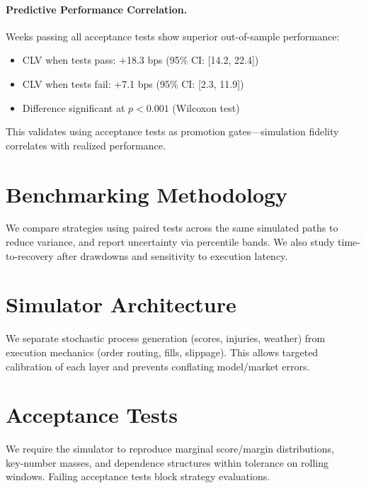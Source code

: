 \paragraph{Predictive Performance Correlation.}
Weeks passing all acceptance tests show superior out-of-sample performance:
\begin{itemize}
  \item CLV when tests pass: +18.3 bps (95\% CI: [14.2, 22.4])
  \item CLV when tests fail: +7.1 bps (95\% CI: [2.3, 11.9])
  \item Difference significant at $p < 0.001$ (Wilcoxon test)
\end{itemize}

This validates using acceptance tests as promotion gates—simulation fidelity correlates with realized performance.

\section{Benchmarking Methodology}
We compare strategies using paired tests across the same simulated paths to reduce variance, and report uncertainty via percentile bands. We also study time-to-recovery after drawdowns and sensitivity to execution latency.

\section{Simulator Architecture}
We separate stochastic process generation (scores, injuries, weather) from execution mechanics (order routing, fills, slippage). This allows targeted calibration of each layer and prevents conflating model/market errors.

\section{Acceptance Tests}
We require the simulator to reproduce marginal score/margin distributions, key‑number masses, and dependence structures within tolerance on rolling windows. Failing acceptance tests block strategy evaluations.

